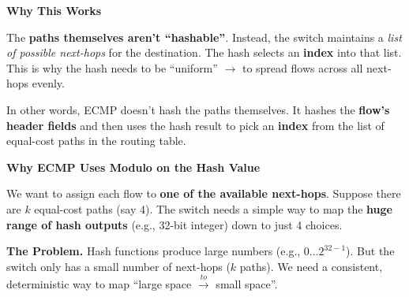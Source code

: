 \begin{deepeningbox}
    \newpage

    \begin{flushleft}
        \textcolor{Green3}{ \textbf{Why This Works}}
    \end{flushleft}
    The \textbf{paths themselves aren't ``hashable''}. Instead, the switch maintains a \emph{list of possible next-hops} for the destination. The hash selects an \textbf{index} into that list. This is why the hash needs to be ``uniform'' $\rightarrow$ to spread flows across all next-hops evenly.

    In other words, ECMP doesn't hash the paths themselves. It hashes the \textbf{flow's header fields} and then uses the hash result to pick an \textbf{index} from the list of equal-cost paths in the routing table.

    \highspace
    \begin{flushleft}
        \textcolor{Green3}{ \textbf{Why ECMP Uses Modulo on the Hash Value}}
    \end{flushleft}
    We want to assign each flow to \textbf{one of the available next-hops}. Suppose there are $k$ equal-cost paths (say 4). The switch needs a simple way to map the \textbf{huge range of hash outputs} (e.g., 32-bit integer) down to just 4 choices.

    \textcolor{Red2}{ \textbf{The Problem.}} Hash functions produce large numbers (e.g., $0 \dots 2^{32-1}$). But the switch only has a small number of next-hops ($k$ paths). We need a consistent, deterministic way to map ``large space $\xrightarrow{to}$ small space''.


\end{deepeningbox}
